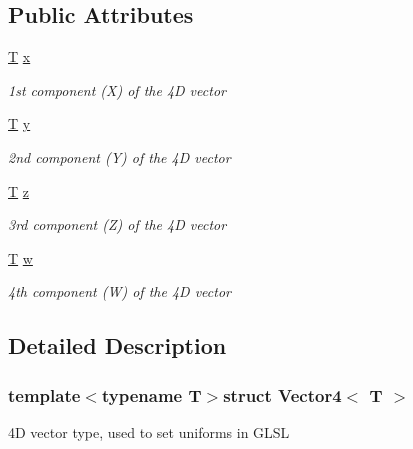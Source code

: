 \subsection*{Public Attributes}
\begin{DoxyCompactItemize}
\item 
\hyperlink{curses_8priv_8h_a5ef253115820acf7d27f3c5c3b02a0f0}{T} \hyperlink{struct_vector4_a2cedf20d2f695a4f0254681b13311ac9}{x}
\begin{DoxyCompactList}\small\item\em 1st component (X) of the 4\-D vector \end{DoxyCompactList}\item 
\hyperlink{curses_8priv_8h_a5ef253115820acf7d27f3c5c3b02a0f0}{T} \hyperlink{struct_vector4_aad001ba27515dc2dcb921e9c83596520}{y}
\begin{DoxyCompactList}\small\item\em 2nd component (Y) of the 4\-D vector \end{DoxyCompactList}\item 
\hyperlink{curses_8priv_8h_a5ef253115820acf7d27f3c5c3b02a0f0}{T} \hyperlink{struct_vector4_a5a7a1452d661e0b24e4b04c4dbff8ae7}{z}
\begin{DoxyCompactList}\small\item\em 3rd component (Z) of the 4\-D vector \end{DoxyCompactList}\item 
\hyperlink{curses_8priv_8h_a5ef253115820acf7d27f3c5c3b02a0f0}{T} \hyperlink{struct_vector4_a83daff43fa2b88b4e76474f4b9a45276}{w}
\begin{DoxyCompactList}\small\item\em 4th component (W) of the 4\-D vector \end{DoxyCompactList}\end{DoxyCompactItemize}


\subsection{Detailed Description}
\subsubsection*{template$<$typename T$>$struct Vector4$<$ T $>$}

4\-D vector type, used to set uniforms in G\-L\-S\-L 

